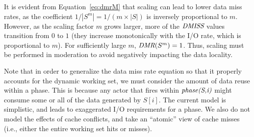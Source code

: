It is evident from Equation~\ref{eq:dmrM} that scaling can lead to
lower data miss rates, as the coefficient $1/|S^m| = 1/(m \times |S|)$
is inversely proportional to $m$.  However, as the scaling factor $m$
grows larger, more of the $\mbox{\it DMISS}$ values transition from $0$ to
$1$ (they increase monotonically with the I/O rate, which is
proportional to $m$).  For sufficiently large $m$, $\mbox{\it DMR}(S^m) =
1$.  Thus, scaling must be performed in moderation to avoid negatively
impacting the data locality.

Note that in order to generalize the data miss rate equation so that it properly
accounts for the dynamic working set, we must consider the amount of
data reuse within a phase. This is because any actor that fires within
$\mbox{\it phase(S,i)}$ might consume some or all of the data
generated by $S[i]$. The current model is simplistic, and leads to
exaggerated I/O requirements for a phase. We also do not model the
effects of cache conflicts, and take an ``atomic'' view of cache
misses (i.e., either the entire working set hits or misses).

